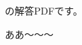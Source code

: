 \documentclass[uplatex,dvipdfmx]{jsarticle}
\begin{document}
\tableofcontents

\cite{jost2017riemannian}の解答PDFです。

ああ〜〜〜



\printbibliography
\end{document}
